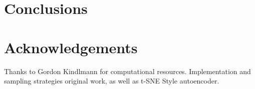 \documentclass[a4paper]{article}
\begin{document}
\section{Conclusions}
\label{sec:conclusion}

\section{Acknowledgements}
\label{sec:acknowledgements}

Thanks to Gordon Kindlmann for computational resources. Implementation and
sampling strategies original work, as well as t-SNE Style autoencoder.

\newpage
\eightpt



\end{document}
